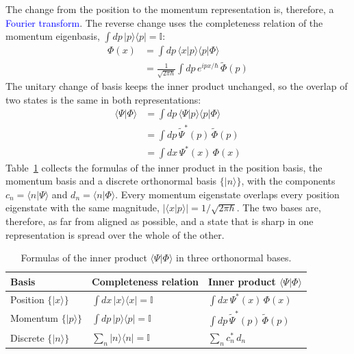 The change from the position to the momentum representation is, therefore, a \textcolor{blue}{Fourier transform}. The reverse change uses the completeness relation of the momentum eigenbasis, $\int dp\, |p\rangle\langle p| = \mathbb{I}$:
\begin{align*}
    \Phi(x) &= \int dp\, \langle x | p \rangle \langle p | \Phi \rangle \\
    &= \frac{1}{\sqrt{2\pi\hbar}} \int dp\, e^{ipx/\hbar}\, \tilde{\Phi}(p)
\end{align*}
The unitary change of basis keeps the inner product unchanged, so the overlap of two states is the same in both representations:
\begin{align*}
    \langle \Psi | \Phi \rangle &= \int dp\, \langle \Psi | p \rangle \langle p | \Phi \rangle \\
    &= \int dp\, \tilde{\Psi}^{*}(p)\, \tilde{\Phi}(p) \\
    &= \int dx\, \Psi^{*}(x)\, \Phi(x)
\end{align*}
Table~\ref{tab:inner} collects the formulas of the inner product in the position basis, the momentum basis and a discrete orthonormal basis $\{|n\rangle\}$, with the components $c_n = \langle n | \Psi \rangle$ and $d_n = \langle n | \Phi \rangle$. Every momentum eigenstate overlaps every position eigenstate with the same magnitude, $|\langle x | p \rangle| = 1/\sqrt{2\pi\hbar}$. The two bases are, therefore, as far from aligned as possible, and a state that is sharp in one representation is spread over the whole of the other.

\begin{table}[h]
    \centering
    \caption{Formulas of the inner product $\langle \Psi | \Phi \rangle$ in three orthonormal bases.}
    \label{tab:inner}
    \renewcommand{\arraystretch}{1.5}
    \begin{tabular}{lll}
        \toprule
        Basis & Completeness relation & Inner product $\langle \Psi | \Phi \rangle$ \\
        \midrule
        Position $\{|x\rangle\}$ & $\int dx\, |x\rangle\langle x| = \mathbb{I}$ & $\int dx\, \Psi^{*}(x)\, \Phi(x)$ \\
        Momentum $\{|p\rangle\}$ & $\int dp\, |p\rangle\langle p| = \mathbb{I}$ & $\int dp\, \tilde{\Psi}^{*}(p)\, \tilde{\Phi}(p)$ \\
        Discrete $\{|n\rangle\}$ & $\sum_n |n\rangle\langle n| = \mathbb{I}$ & $\sum_n c_n^{*}\, d_n$ \\
        \bottomrule
    \end{tabular}
\end{table}
